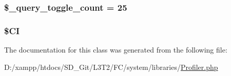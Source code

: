\subsubsection[{\$\+\_\+query\+\_\+toggle\+\_\+count}]{\setlength{\rightskip}{0pt plus 5cm}\$\+\_\+query\+\_\+toggle\+\_\+count = 25\hspace{0.3cm}{\ttfamily [protected]}}\label{class_c_i___profiler_a950aa6662ddde22ba9c05adffd6a20c9}
\hypertarget{class_c_i___profiler_ae0314d046ddf7fcfaec03222977427d3}{}
\subsubsection[{\$\+C\+I}]{\setlength{\rightskip}{0pt plus 5cm}\$C\+I\hspace{0.3cm}{\ttfamily [protected]}}\label{class_c_i___profiler_ae0314d046ddf7fcfaec03222977427d3}


The documentation for this class was generated from the following file\+:\begin{DoxyCompactItemize}
\item 
D\+:/xampp/htdocs/\+S\+D\+\_\+\+Git/\+L3\+T2/\+F\+C/system/libraries/\hyperlink{system_2libraries_2profiler_8php}{Profiler.\+php}\end{DoxyCompactItemize}
